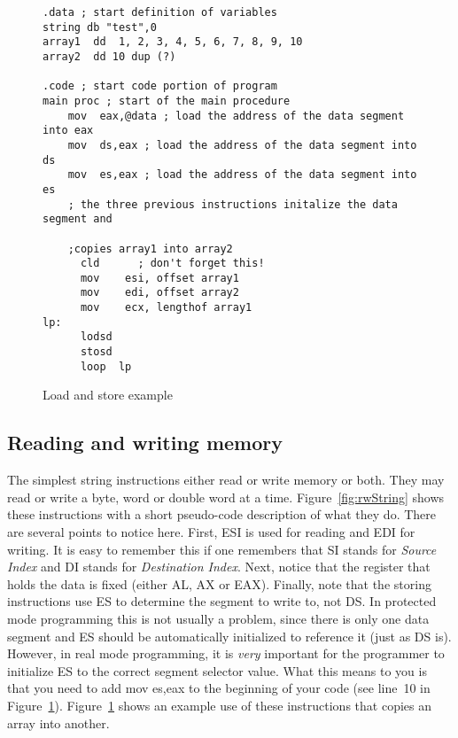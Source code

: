 \begin{figure}[t]
\begin{lstlisting}[language={[x86masm]Assembler},frame=single]
.data ; start definition of variables
string db "test",0
array1  dd  1, 2, 3, 4, 5, 6, 7, 8, 9, 10
array2  dd 10 dup (?)

.code ; start code portion of program
main proc ; start of the main procedure
    mov  eax,@data ; load the address of the data segment into eax
    mov  ds,eax ; load the address of the data segment into ds
    mov  es,eax ; load the address of the data segment into es
    ; the three previous instructions initalize the data segment and 

    ;copies array1 into array2
      cld      ; don't forget this!
      mov    esi, offset array1
      mov    edi, offset array2
      mov    ecx, lengthof array1
lp:
      lodsd  
      stosd
      loop  lp
\end{lstlisting}
\caption{Load and store example\label{fig:lodEx}}
\end{figure}

\subsection{Reading and writing memory}

The simplest string instructions either read or write memory or
both. They may read or write a byte, word or double word at a time.
Figure~\ref{fig:rwString} shows these instructions with a short
pseudo-code description of what they do. There are several points to
notice here. First, ESI is used for reading and EDI for writing. It is
easy to remember this if one remembers that SI stands for \emph{Source
Index} and DI stands for \emph{Destination
Index}.   Next, notice that
the register that holds the data is fixed (either AL, AX or
EAX). Finally, note that the storing instructions use ES to determine
the segment to write to, not DS. In protected mode programming this is
not usually a problem, since there is only one data segment and ES
should be automatically initialized to reference it (just as DS
is). However, in real mode programming, it is \emph{very} important
for the programmer to initialize ES to the correct segment
 selector value.  What this means to you is that 
you need to add {\code mov es,eax} to the beginning of your code (see 
line~10 in Figure~\ref{fig:lodEx}).  Figure~\ref{fig:lodEx} shows an example use of these
instructions that copies an array into another.

